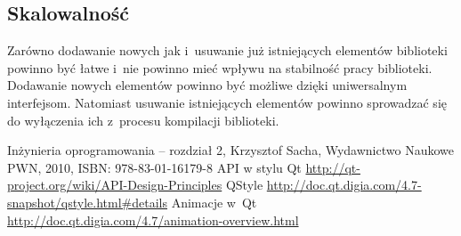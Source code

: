 \documentclass[11pt,twoside,a4paper,final]{article}
\begin{document}
\subsection{Skalowalność}
Zarówno dodawanie nowych jak i~usuwanie już istniejących elementów biblioteki powinno być łatwe i~nie powinno mieć wpływu na stabilność pracy biblioteki. Dodawanie nowych elementów powinno być możliwe dzięki uniwersalnym interfejsom. Natomiast usuwanie istniejących elementów powinno sprowadzać się do wyłączenia ich z~procesu kompilacji biblioteki.

\begin{thebibliography}{}
Inżynieria oprogramowania -- rozdział 2, Krzysztof Sacha, Wydawnictwo Naukowe PWN, 2010, ISBN: 978-83-01-16179-8
API w stylu Qt \url{http://qt-project.org/wiki/API-Design-Principles}
QStyle \url{http://doc.qt.digia.com/4.7-snapshot/qstyle.html#details}
Animacje w~Qt \url{http://doc.qt.digia.com/4.7/animation-overview.html}


\end{thebibliography}
\end{document}
